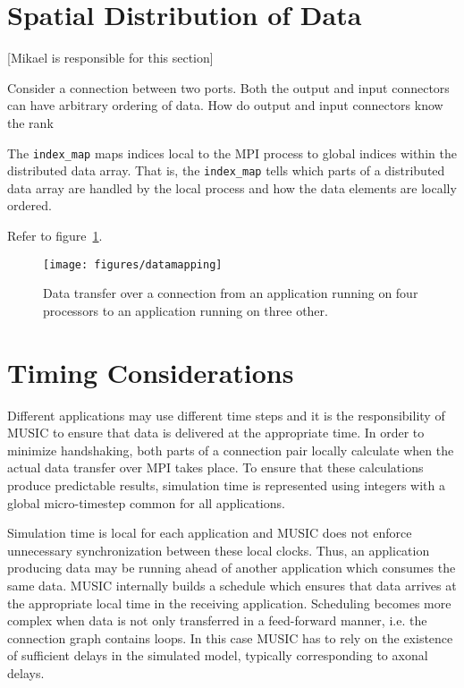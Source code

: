 \documentclass[a4paper]{report}
\newcommand{\responsible}[1]%
{{\color{red}[#1 is responsible for this section]}}
\begin{document}
\section{Spatial Distribution of Data}
\responsible{Mikael}

Consider a connection between two ports.  Both the output and input
connectors can have arbitrary ordering of data.  How do output and
input connectors know the rank

The \lstinline|index_map| maps indices local to the MPI process to global
indices within the distributed data array.  That is, the
\lstinline|index_map| tells which parts of a distributed data array are
handled by the local process and how the data elements are locally
ordered.


Refer to figure~\ref{fig:datamapping}.

\begin{figure}
  \begin{center}
    \texttt{[image: figures/datamapping]}
    \caption[Mapping of data]{\label{fig:datamapping}
      Data transfer over a connection from an application running on
      four processors to an application running on three other.
    }
  \end{center}
\end{figure}

\section{Timing Considerations}
\label{sec:timing}
  
Different applications may use different time steps and it is the
responsibility of MUSIC to ensure that data is delivered at the
appropriate time.  In order to minimize handshaking, both parts of a
connection pair locally calculate when the actual data transfer over
MPI takes place.  To ensure that these calculations produce
predictable results, simulation time is represented using integers
with a global micro-timestep common for all
applications.

Simulation time is local for each application
and MUSIC does not enforce unnecessary synchronization between these
local clocks.  Thus, an application producing data may be running
ahead of another application which consumes the same data.  MUSIC
internally builds a schedule which ensures that data arrives at the
appropriate local time in the receiving application.  Scheduling
becomes more complex when data is not only transferred in a
feed-forward manner, i.e. the connection graph contains loops.  In
this case MUSIC has to rely on the existence of sufficient delays in
the simulated model, typically corresponding to axonal
delays.
\end{document}
